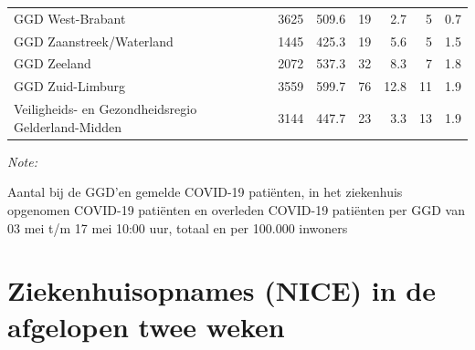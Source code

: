 \documentclass[
  english,
  man,floatsintext]{apa6}
\begin{document}
\begin{table}
\begin{threeparttable}
\begin{tabular}{lrrrrrr}
GGD West-Brabant & 3625 & 509.6 & 19 & 2.7 & 5 & 0.7\\
GGD Zaanstreek/Waterland & 1445 & 425.3 & 19 & 5.6 & 5 & 1.5\\
GGD Zeeland & 2072 & 537.3 & 32 & 8.3 & 7 & 1.8\\
GGD Zuid-Limburg & 3559 & 599.7 & 76 & 12.8 & 11 & 1.9\\
Veiligheids- en Gezondheidsregio Gelderland-Midden & 3144 & 447.7 & 23 & 3.3 & 13 & 1.9\\
\bottomrule
\end{tabular}
\begin{tablenotes}
\item \textit{Note: } 
\item Aantal bij de GGD’en gemelde COVID-19 patiënten, in het ziekenhuis opgenomen COVID-19 patiënten en overleden COVID-19 patiënten per GGD van 03 mei t/m 17 mei 10:00 uur, totaal en per 100.000 inwoners
\end{tablenotes}
\end{threeparttable}
\endgroup{}
\end{table}

\newpage

\hypertarget{ziekenhuisopnames-nice-in-de-afgelopen-twee-weken}{%
\section{Ziekenhuisopnames (NICE) in de afgelopen twee weken}\label{ziekenhuisopnames-nice-in-de-afgelopen-twee-weken}}
\end{document}

